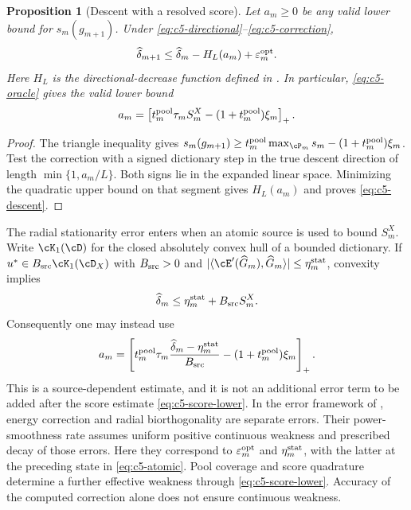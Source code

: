 \documentclass[11pt]{article}
\newtheorem{proposition}[theorem]{Proposition}
\theoremstyle{remark}
\begin{document}
\begin{proposition}[Descent with a resolved score]
\label{prop:c5-descent}
Let $a_m\geq0$ be any valid lower bound for $s_m(g_{m+1})$.
Under \eqref{eq:c5-directional}--\eqref{eq:c5-correction},
\begin{equation}
 \widehat\delta_{m+1}\leq\widehat\delta_m-H_L(a_m)
                       +\varepsilon_m^{\rm opt}.
 \label{eq:c5-descent}
\end{equation}
Here $H_L$ is the directional-decrease function defined in \CGAHLDreference.
In particular, \eqref{eq:c5-oracle} gives the valid lower bound
\begin{equation}
 a_m=\left[t_m^{\rm pool}\tau_m S_m^X
                 -(1+t_m^{\rm pool})\xi_m\right]_+ .
 \label{eq:c5-score-lower}
\end{equation}
\end{proposition}
\begin{proof}
The triangle inequality gives
$s_m(g_{m+1})\geq
t_m^{\rm pool}\max_{\cP_m}s_m-(1+t_m^{\rm pool})\xi_m$.
Test the correction with a signed dictionary step in the true descent
direction of length $\min\{1,a_m/L\}$. Both signs lie in the expanded
linear space. Minimizing the quadratic upper bound on that segment
gives $H_L(a_m)$ and proves \eqref{eq:c5-descent}.
\end{proof}

The radial stationarity error enters when an atomic source is used to
bound $S_m^X$. Write $\cK_1(\cD)$ for the closed absolutely convex hull
of a bounded dictionary. If
$u^*\in B_{\rm src}\cK_1(\cD_X)$ with $B_{\rm src}>0$ and
$|\langle\cE'(\widehat G_m),\widehat G_m\rangle|
\leq\eta_m^{\rm stat}$, convexity implies
\begin{equation}
 \widehat\delta_m\leq\eta_m^{\rm stat}+B_{\rm src}S_m^X .
 \label{eq:c5-atomic}
\end{equation}
Consequently one may instead use
\[
 a_m=\left[
 t_m^{\rm pool}\tau_m
       \frac{\widehat\delta_m-\eta_m^{\rm stat}}{B_{\rm src}}
 -(1+t_m^{\rm pool})\xi_m\right]_+ .
\]
This is a source-dependent estimate, and it is not an additional error
term to be added after the score estimate \eqref{eq:c5-score-lower}.
In the error framework of \cite[Section~3, Theorem~3.2 and
Lemma~6.3]{DereventsovTemlyakov2022}, energy correction and radial
biorthogonality are separate errors. Their power-smoothness rate assumes
uniform positive continuous weakness and prescribed decay of those errors.
Here they correspond to $\varepsilon_m^{\rm opt}$ and
$\eta_m^{\rm stat}$, with the latter at the preceding state in
\eqref{eq:c5-atomic}. Pool coverage and score quadrature determine a further
effective weakness through \eqref{eq:c5-score-lower}. Accuracy of the
computed correction alone does not ensure continuous weakness.
\end{document}
